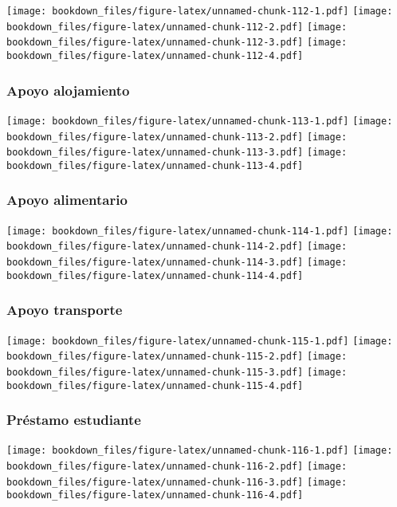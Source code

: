 \documentclass[]{article}
\theoremstyle{definition}
\theoremstyle{definition}
\theoremstyle{definition}
\theoremstyle{remark}
\begin{document}
\texttt{[image: bookdown\_files/figure-latex/unnamed-chunk-112-1.pdf]}
\texttt{[image: bookdown\_files/figure-latex/unnamed-chunk-112-2.pdf]}
\texttt{[image: bookdown\_files/figure-latex/unnamed-chunk-112-3.pdf]}
\texttt{[image: bookdown\_files/figure-latex/unnamed-chunk-112-4.pdf]}

\subsubsection{Apoyo alojamiento}\label{apoyo-alojamiento}

\texttt{[image: bookdown\_files/figure-latex/unnamed-chunk-113-1.pdf]}
\texttt{[image: bookdown\_files/figure-latex/unnamed-chunk-113-2.pdf]}
\texttt{[image: bookdown\_files/figure-latex/unnamed-chunk-113-3.pdf]}
\texttt{[image: bookdown\_files/figure-latex/unnamed-chunk-113-4.pdf]}

\subsubsection{Apoyo alimentario}\label{apoyo-alimentario}

\texttt{[image: bookdown\_files/figure-latex/unnamed-chunk-114-1.pdf]}
\texttt{[image: bookdown\_files/figure-latex/unnamed-chunk-114-2.pdf]}
\texttt{[image: bookdown\_files/figure-latex/unnamed-chunk-114-3.pdf]}
\texttt{[image: bookdown\_files/figure-latex/unnamed-chunk-114-4.pdf]}

\subsubsection{Apoyo transporte}\label{apoyo-transporte}

\texttt{[image: bookdown\_files/figure-latex/unnamed-chunk-115-1.pdf]}
\texttt{[image: bookdown\_files/figure-latex/unnamed-chunk-115-2.pdf]}
\texttt{[image: bookdown\_files/figure-latex/unnamed-chunk-115-3.pdf]}
\texttt{[image: bookdown\_files/figure-latex/unnamed-chunk-115-4.pdf]}

\subsubsection{Préstamo estudiante}\label{prestamo-estudiante}

\texttt{[image: bookdown\_files/figure-latex/unnamed-chunk-116-1.pdf]}
\texttt{[image: bookdown\_files/figure-latex/unnamed-chunk-116-2.pdf]}
\texttt{[image: bookdown\_files/figure-latex/unnamed-chunk-116-3.pdf]}
\texttt{[image: bookdown\_files/figure-latex/unnamed-chunk-116-4.pdf]}
\end{document}
